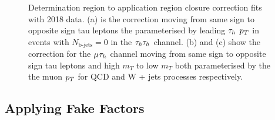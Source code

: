 \begin{figure}[!hbtp]
\centering
\caption{Determination region to application region closure correction fits with 2018 data. (a) is the correction moving from same sign to opposite sign tau leptons the parameterised by leading $\tau_{h}$ $p_{T}$ in events with $N_{\text{b-jets}}=0$ in the $\tau_{h}\tau_{h}$ channel. (b) and (c) show the correction for the $\mu_{}\tau_{h}$ channel moving from same sign to opposite sign tau leptons and high $m_{T}$ to low $m_{T}$ both parameterised by the the muon $p_{T}$ for QCD and W + jets processes respectively.}
\label{fig:ff_dr_to_ar}
\end{figure}

\subsection{Applying Fake Factors}
\label{sec:ff_applying}

